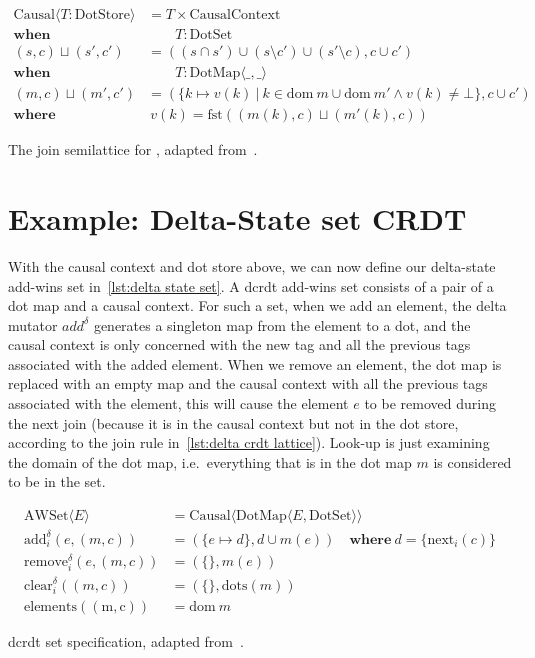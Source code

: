 \begin{listing}[htp]
  \centering
\begin{align*}
  \mathrm{Causal}\langle T:\mathrm{DotStore}\rangle &= T\times \mathrm{CausalContext} \\
  \mathbf{when} &\qquad T:\mathrm{DotSet} \\
  (s,c)\sqcup (s',c') &= ((s\cap s')\cup (s\setminus c')\cup(s'\setminus c),c\cup c') \\
  \mathbf{when} &\qquad T:\mathrm{DotMap}\langle \_, \_\rangle \\
  (m, c) \sqcup (m', c') &= (\{k\mapsto v(k)\ |\ k\in \mathrm{dom}\ m \cup \mathrm{dom}\ m' \land v(k) \neq \bot\}, c \cup c') \\
  \mathbf{where}&\ v(k) = \mathrm{fst}((m(k), c) \sqcup (m'(k), c))
\end{align*}
  \caption{The join semilattice for , adapted from~\cite{almeida2018DeltaCRDT}.}
  \label{lst:delta crdt lattice}
\end{listing}


\section{Example: Delta-State set CRDT}

With the causal context and dot store above, we can now define our delta-state
add-wins set in~\cref{lst:delta state set}. A \acrshort{dcrdt} add-wins set
consists of a pair of a dot map and a causal context.
For such a set, when we add an element, the delta mutator \(add^\delta\) generates a
singleton map from the element to a dot, and the causal context is only concerned
with the new tag and all the previous tags associated with the added element. When we
remove an element, the dot map is replaced with an empty map and the causal context
with all the previous tags associated with the element, this will cause the
element \(e\) to be removed during the next join (because it is in the causal context
but not in the dot store, according to the join rule in~\cref{lst:delta crdt lattice}). 
Look-up is just examining the
domain of the dot map, i.e.\ everything that is in the dot map \(m\) is considered to be
in the set.

\begin{listing}[htp]
  \begin{align*}
    \mathrm{AWSet}\langle E\rangle &= \mathrm{Causal}\langle \mathrm{DotMap}\langle E, \mathrm{DotSet} \rangle\rangle \\
    \mathrm{add}_i^\delta(e, (m, c)) &= (\{e\mapsto d\}, d\cup m(e))\quad \mathbf{where}\ d=\{\mathrm{next}_i(c)\} \\
    \mathrm{remove}_i^\delta(e, (m, c)) &= (\{\}, m(e)) \\
    \mathrm{clear}_i^\delta((m, c)) &= (\{\}, \mathrm{dots}(m)) \\
    \mathrm{elements((m, c))} &= \mathrm{dom}\ m
  \end{align*}
 \caption{\acrshort{dcrdt} set specification, adapted from~\cite{almeida2018DeltaCRDT}.} 
 \label{lst:delta state set}
\end{listing}

